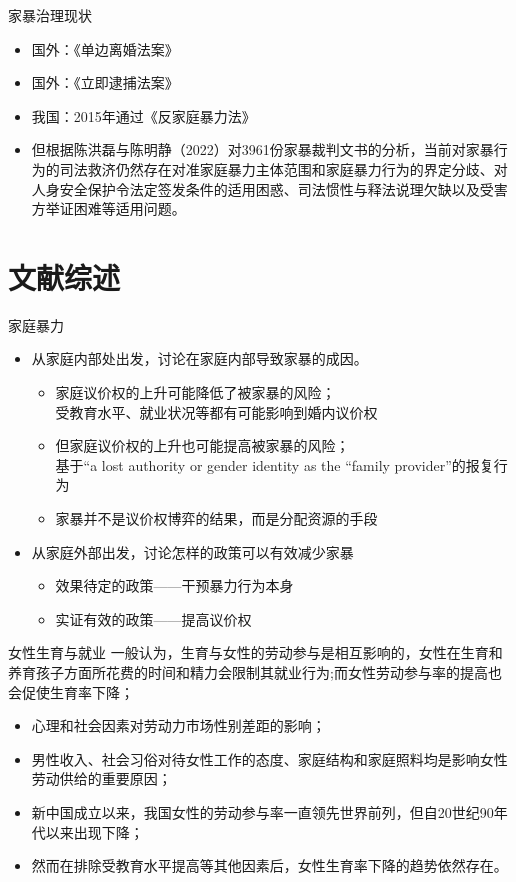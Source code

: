\documentclass{beamer}
\begin{document}
\begin{frame}{家暴治理现状}
    \begin{itemize}[<+-| alert@+>] 
        \item 国外：《单边离婚法案》
        \item 国外：《立即逮捕法案》
        \item 我国：2015年通过《反家庭暴力法》
        \item 但根据陈洪磊与陈明静（2022）对3961份家暴裁判文书的分析，当前对家暴行为的司法救济仍然存在对准家庭暴力主体范围和家庭暴力行为的界定分歧、对人身安全保护令法定签发条件的适用困惑、司法惯性与释法说理欠缺以及受害方举证困难等适用问题。
    \end{itemize}
\end{frame}

\section{文献综述}
\begin{frame}{家庭暴力}
    \begin{itemize}[<+-| alert@+>] 
        \item 从家庭内部处出发，讨论在家庭内部导致家暴的成因。
        \begin{itemize}
            \item 家庭议价权的上升可能降低了被家暴的风险；\\ 受教育水平、就业状况等都有可能影响到婚内议价权
            \item 但家庭议价权的上升也可能提高被家暴的风险；\\ 基于“a lost authority or gender identity as the “family provider”的报复行为
            \item 家暴并不是议价权博弈的结果，而是分配资源的手段
        \end{itemize}
        \item 从家庭外部出发，讨论怎样的政策可以有效减少家暴
        \begin{itemize}
            \item 效果待定的政策——干预暴力行为本身
            \item 实证有效的政策——提高议价权
        \end{itemize}
    \end{itemize}
\end{frame}


\begin{frame}{女性生育与就业}
    一般认为，生育与女性的劳动参与是相互影响的，女性在生育和养育孩子方面所花费的时间和精力会限制其就业行为;而女性劳动参与率的提高也会促使生育率下降；
    \begin{itemize}[<+-| alert@+>] 
        \item 心理和社会因素对劳动力市场性别差距的影响；
        \item 男性收入、社会习俗对待女性工作的态度、家庭结构和家庭照料均是影响女性劳动供给的重要原因；
        \item 新中国成立以来，我国女性的劳动参与率一直领先世界前列，但自20世纪90年代以来出现下降；
        \item 然而在排除受教育水平提高等其他因素后，女性生育率下降的趋势依然存在。
    \end{itemize}
\end{frame}
\end{document}
